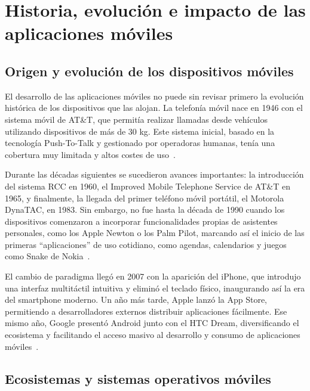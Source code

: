 


\section{Historia, evolución e impacto de las aplicaciones móviles}

\subsection{Origen y evolución de los dispositivos móviles}

El desarrollo de las aplicaciones móviles no puede sin revisar primero la evolución histórica de los dispositivos que las alojan. La telefonía móvil nace en 1946 con el sistema móvil de AT\&T, que permitía realizar llamadas desde vehículos utilizando dispositivos de más de 30 kg. Este sistema inicial, basado en la tecnología Push-To-Talk y gestionado por operadoras humanas, tenía una cobertura muy limitada y altos costes de uso~\cite{agar2004}.



Durante las décadas siguientes se sucedieron avances importantes: la introducción del sistema RCC en 1960, el Improved Mobile Telephone Service de AT\&T en 1965, y finalmente, la llegada del primer teléfono móvil portátil, el Motorola DynaTAC, en 1983. Sin embargo, no fue hasta la década de 1990 cuando los dispositivos comenzaron a incorporar funcionalidades propias de asistentes personales, como los Apple Newton o los Palm Pilot, marcando así el inicio de las primeras ``aplicaciones'' de uso cotidiano, como agendas, calendarios y juegos como Snake de Nokia~\cite{west2010}.

El cambio de paradigma llegó en 2007 con la aparición del iPhone, que introdujo una interfaz multitáctil intuitiva y eliminó el teclado físico, inaugurando así la era del smartphone moderno. Un año más tarde, Apple lanzó la App Store, permitiendo a desarrolladores externos distribuir aplicaciones fácilmente. Ese mismo año, Google presentó Android junto con el HTC Dream, diversificando el ecosistema y facilitando el acceso masivo al desarrollo y consumo de aplicaciones móviles~\cite{murphy2014}.

\subsection{Ecosistemas y sistemas operativos móviles}

